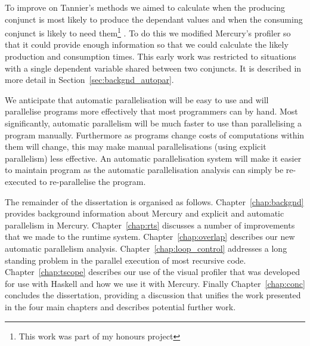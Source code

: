 To improve on Tannier's methods we aimed to calculate when the
producing conjunct is most likely to produce the dependant values and
when the consuming conjunct is likely to need them\footnote{
    This work was part of my honours project}
\citep*{bone:2008:hons}.
To do this we modified Mercury's profiler so that it could provide enough
information so that we could calculate the likely production and
consumption times.
This early work was restricted to situations with a
single dependent variable shared between two conjuncts.
It is described in more detail in Section~\ref{sec:backgnd_autopar}.

We anticipate that automatic parallelisation will be easy to use and
will parallelise programs more effectively that most programmers can by
hand.
Most significantly,
automatic parallelism will be much faster to use than parallelising a
program manually.
Furthermore as programs change costs of computations within them will 
change,
this may make manual parallelisations (using explicit parallelism) less
effective.
An automatic parallelisation system will make it easier to maintain
program as the automatic parallelisation analysis can simply be
re-executed to re-parallelise the program.

The remainder of the dissertation is organised as follows.
Chapter~\ref{chap:backgnd} provides background information about
Mercury and explicit and automatic parallelism in Mercury.
Chapter~\ref{chap:rts} discusses a number of improvements that we made to
the runtime system.
Chapter~\ref{chap:overlap} describes our new automatic parallelism
analysis.
Chapter~\ref{chap:loop_control} addresses a long standing problem in the
parallel execution of most recursive code.
Chapter~\ref{chap:tscope} describes our use of the \tscope visual
profiler that was developed for use with Haskell and how we use it with
Mercury.
Finally Chapter~\ref{chap:conc} concludes the dissertation, providing a
discussion that unifies the work presented in the four main chapters and
describes potential further work.

